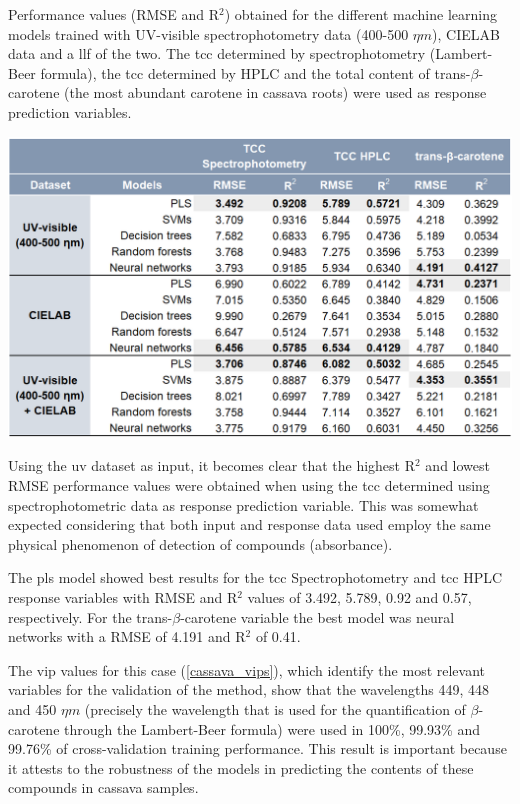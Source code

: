 \begin{table}[H]
	\centering
	\caption{Performance values (RMSE and R$^{2}$) obtained for the different machine learning models trained with UV-visible spectrophotometry data (400-500 $\eta m$), CIELAB data and a \gls{llf} of the two. The \acrfull{tcc} determined by spectrophotometry (Lambert-Beer formula), the \gls{tcc} determined by HPLC and the total content of trans-$\beta$-carotene (the most abundant carotene in cassava roots) were used as response prediction variables.}
	\includegraphics[width=0.9\linewidth]{Imagens/Case_study/ml_table}
	\label{cassava_ml}
\end{table}

Using the \gls{uv} dataset as input, it becomes clear that the highest R$^{2}$ and lowest RMSE performance values were obtained when using the \gls{tcc} determined using spectrophotometric data as response prediction variable. This was somewhat expected considering that both input and response data used employ the same physical phenomenon of detection of compounds (absorbance). 

The \gls{pls} model showed best results for the \gls{tcc} Spectrophotometry and \gls{tcc} HPLC response variables with RMSE and R$^{2}$ values of 3.492, 5.789, 0.92 and 0.57, respectively. For the trans-$\beta$-carotene variable the best model was neural networks with a RMSE of 4.191 and R$^{2}$ of 0.41.

The \gls{vip} values for this case (\autoref{cassava_vips}), which identify the most relevant variables for the validation of the method, show that the wavelengths 449, 448 and 450 $\eta m$ (precisely the wavelength that is used for the quantification of $\beta$-carotene through the Lambert-Beer formula) were used in 100\%, 99.93\% and 99.76\% of cross-validation training performance. This result is important because it attests to the robustness of the models in predicting the contents of these compounds in cassava samples.

